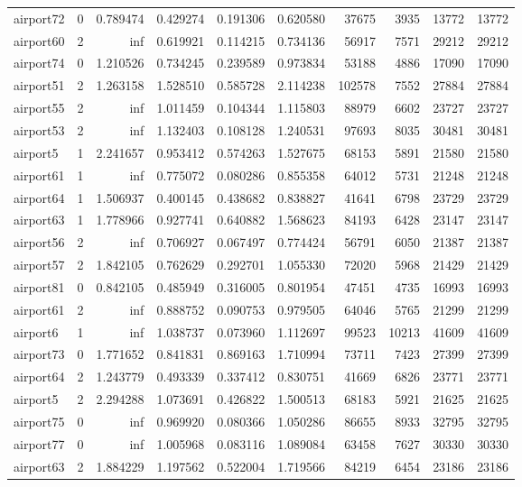 \begin{longtable}{|l|r|r|r|r|r|r|r|r|r|}
airport72 & 0 & 0.789474 & 0.429274 & 0.191306 & 0.620580 & 37675 & 3935 & 13772 & 13772 \\
airport60 & 2 & inf & 0.619921 & 0.114215 & 0.734136 & 56917 & 7571 & 29212 & 29212 \\
airport74 & 0 & 1.210526 & 0.734245 & 0.239589 & 0.973834 & 53188 & 4886 & 17090 & 17090 \\
airport51 & 2 & 1.263158 & 1.528510 & 0.585728 & 2.114238 & 102578 & 7552 & 27884 & 27884 \\
airport55 & 2 & inf & 1.011459 & 0.104344 & 1.115803 & 88979 & 6602 & 23727 & 23727 \\
airport53 & 2 & inf & 1.132403 & 0.108128 & 1.240531 & 97693 & 8035 & 30481 & 30481 \\
airport5 & 1 & 2.241657 & 0.953412 & 0.574263 & 1.527675 & 68153 & 5891 & 21580 & 21580 \\
airport61 & 1 & inf & 0.775072 & 0.080286 & 0.855358 & 64012 & 5731 & 21248 & 21248 \\
airport64 & 1 & 1.506937 & 0.400145 & 0.438682 & 0.838827 & 41641 & 6798 & 23729 & 23729 \\
airport63 & 1 & 1.778966 & 0.927741 & 0.640882 & 1.568623 & 84193 & 6428 & 23147 & 23147 \\
airport56 & 2 & inf & 0.706927 & 0.067497 & 0.774424 & 56791 & 6050 & 21387 & 21387 \\
airport57 & 2 & 1.842105 & 0.762629 & 0.292701 & 1.055330 & 72020 & 5968 & 21429 & 21429 \\
airport81 & 0 & 0.842105 & 0.485949 & 0.316005 & 0.801954 & 47451 & 4735 & 16993 & 16993 \\
airport61 & 2 & inf & 0.888752 & 0.090753 & 0.979505 & 64046 & 5765 & 21299 & 21299 \\
airport6 & 1 & inf & 1.038737 & 0.073960 & 1.112697 & 99523 & 10213 & 41609 & 41609 \\
airport73 & 0 & 1.771652 & 0.841831 & 0.869163 & 1.710994 & 73711 & 7423 & 27399 & 27399 \\
airport64 & 2 & 1.243779 & 0.493339 & 0.337412 & 0.830751 & 41669 & 6826 & 23771 & 23771 \\
airport5 & 2 & 2.294288 & 1.073691 & 0.426822 & 1.500513 & 68183 & 5921 & 21625 & 21625 \\
airport75 & 0 & inf & 0.969920 & 0.080366 & 1.050286 & 86655 & 8933 & 32795 & 32795 \\
airport77 & 0 & inf & 1.005968 & 0.083116 & 1.089084 & 63458 & 7627 & 30330 & 30330 \\
airport63 & 2 & 1.884229 & 1.197562 & 0.522004 & 1.719566 & 84219 & 6454 & 23186 & 23186 \\

\end{longtable}
